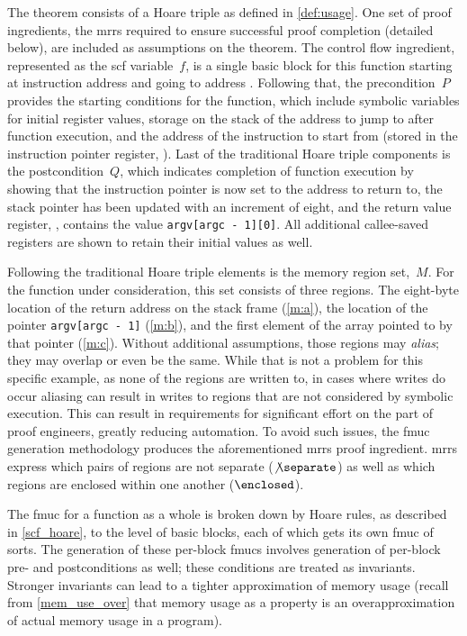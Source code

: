 The theorem consists of a Hoare triple as defined in \cref{def:usage}.
One set of proof ingredients,
the \acp{mrr} required to ensure successful proof completion (detailed below),
are included as assumptions on the theorem.
The control flow ingredient,
represented as the \ac{scf} variable~$f$, is a single basic block for this function
starting at instruction address  and going to address .
Following that,
the precondition~$P$ provides the starting conditions for the function,
which include symbolic variables for initial register values,
storage on the stack of the address to jump to after function execution,
and the address of the instruction to start from
(stored in the instruction pointer register, ).
Last of the traditional Hoare triple components is the postcondition~$Q$,
which indicates completion of function execution
by showing that the instruction pointer is now set to the address to return to,
the stack pointer  has been updated with an increment of eight,
and the return value register, ,
contains the value \lstinline|argv[argc - 1][0]|.
All additional callee-saved registers are shown to retain their initial values%
as well.

Following the traditional Hoare triple elements is the memory region set,~$M$.
For the function under consideration, this set consists of three regions.
The eight-byte location of the return address
on the stack frame (\cref{m:a}),
the location of the pointer \lstinline|argv[argc - 1]| (\cref{m:b}),
and the first element of the array pointed to by that pointer (\cref{m:c}).
Without additional assumptions, those regions may \emph{alias};
they may overlap or even be the same.
While that is not a problem for this specific example,
as none of the regions are written to, in cases where writes do occur
aliasing can result in writes to regions
that are not considered by symbolic execution.
This can result in requirements for significant effort on the part of proof engineers,
greatly reducing automation.
To avoid such issues, the \ac{fmuc} generation methodology
produces the aforementioned \acp{mrr} proof ingredient.%
\Acp{mrr} express which pairs of regions are not separate ($\not\separate$)
as well as which regions are enclosed within one another ($\enclosed$).

The \ac{fmuc} for a function as a whole is broken down by Hoare rules,
as described in \cref{scf_hoare},
to the level of basic blocks, each of which gets its own \ac{fmuc} of sorts.
The generation of these per-block \acp{fmuc} involves generation of per-block
pre- and postconditions as well; these conditions are treated as invariants.
Stronger invariants can lead to a tighter approximation of memory usage
(recall from \cref{mem_use_over} that memory usage as a property
is an overapproximation of actual memory usage in a program).

